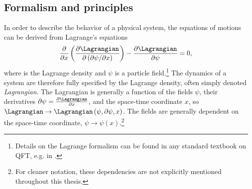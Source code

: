 \subsection{Formalism and principles}
\label{subsec:formalism}


In order to describe the behavior of a physical system, the equations of motions can be derived from Lagrange's equations
\begin{equation}
  \label{eq:euler-lagrange}
  \frac{\partial}{\partial x} \left( \frac{\partial \Lagrangian}{\partial \left(\partial \psi / \partial x \right) } \right) - \frac{\partial \Lagrangian}{\partial \psi} = 0,
\end{equation}
where \Lagrangian is the Lagrange density and $\psi$ is a particle field.\footnote{Details on the Lagrange formalism can be found in any standard textbook on QFT, e.g. in .}
The dynamics of a system are therefore fully specified by the Lagrange density, often simply denoted \emph{Lagrangian}. 
The Lagrangian is generally a function of the fields $\psi$, their derivatives $\partial \psi = \frac{\partial \Lagrangian}{\partial x}$, and the space-time coordinate $x$, so $\Lagrangian \to \Lagrangian \left( \psi, \partial \psi, x \right)$. 
The fields are generally dependent on the space-time coordinate, $\psi \rightarrow \psi(x)$.\footnote{For cleaner notation, these dependencies are not explicitly mentioned throughout this thesis.}

